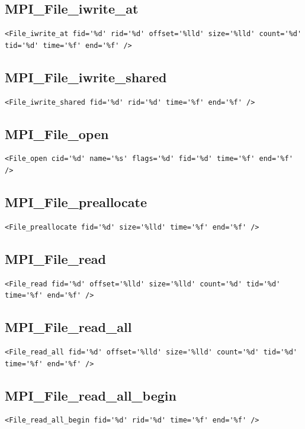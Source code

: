\documentclass[a4paper,12pt,pdftex]{scrartcl}
\begin{document}
\subsection{MPI\_File\_iwrite\_at}
\begin{lstlisting}
<File_iwrite_at fid='%d' rid='%d' offset='%lld' size='%lld' count='%d' tid='%d' time='%f' end='%f' />
\end{lstlisting}

\subsection{MPI\_File\_iwrite\_shared}
\begin{lstlisting}
<File_iwrite_shared fid='%d' rid='%d' time='%f' end='%f' />
\end{lstlisting}

\subsection{MPI\_File\_open}
\begin{lstlisting}
<File_open cid='%d' name='%s' flags='%d' fid='%d' time='%f' end='%f' />
\end{lstlisting}

\subsection{MPI\_File\_preallocate}
\begin{lstlisting}
<File_preallocate fid='%d' size='%lld' time='%f' end='%f' />
\end{lstlisting}

\subsection{MPI\_File\_read}
\begin{lstlisting}
<File_read fid='%d' offset='%lld' size='%lld' count='%d' tid='%d' time='%f' end='%f' />
\end{lstlisting}

\subsection{MPI\_File\_read\_all}
\begin{lstlisting}
<File_read_all fid='%d' offset='%lld' size='%lld' count='%d' tid='%d' time='%f' end='%f' />
\end{lstlisting}

\subsection{MPI\_File\_read\_all\_begin}
\begin{lstlisting}
<File_read_all_begin fid='%d' rid='%d' time='%f' end='%f' />
\end{lstlisting}
\end{document}
